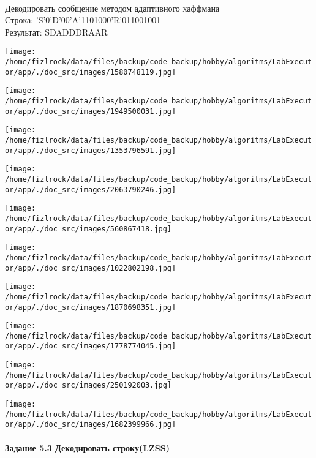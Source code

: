 \documentclass[a4paper, 12pt]{article}
\begin{document}
\\ 

Декодировать сообщение методом адаптивного хаффмана \\
Строка: 
'S'0'D'00'A'1101000'R'011001001\\
Результат: SDADDDRAAR

\texttt{[image: /home/fizlrock/data/files/backup/code\_backup/hobby/algoritms/LabExecutor/app/./doc\_src/images/1580748119.jpg]}

\texttt{[image: /home/fizlrock/data/files/backup/code\_backup/hobby/algoritms/LabExecutor/app/./doc\_src/images/1949500031.jpg]}

\texttt{[image: /home/fizlrock/data/files/backup/code\_backup/hobby/algoritms/LabExecutor/app/./doc\_src/images/1353796591.jpg]}

\texttt{[image: /home/fizlrock/data/files/backup/code\_backup/hobby/algoritms/LabExecutor/app/./doc\_src/images/2063790246.jpg]}

\texttt{[image: /home/fizlrock/data/files/backup/code\_backup/hobby/algoritms/LabExecutor/app/./doc\_src/images/560867418.jpg]}

\texttt{[image: /home/fizlrock/data/files/backup/code\_backup/hobby/algoritms/LabExecutor/app/./doc\_src/images/1022802198.jpg]}

\texttt{[image: /home/fizlrock/data/files/backup/code\_backup/hobby/algoritms/LabExecutor/app/./doc\_src/images/1870698351.jpg]}

\texttt{[image: /home/fizlrock/data/files/backup/code\_backup/hobby/algoritms/LabExecutor/app/./doc\_src/images/1778774045.jpg]}

\texttt{[image: /home/fizlrock/data/files/backup/code\_backup/hobby/algoritms/LabExecutor/app/./doc\_src/images/250192003.jpg]}

\texttt{[image: /home/fizlrock/data/files/backup/code\_backup/hobby/algoritms/LabExecutor/app/./doc\_src/images/1682399966.jpg]}
\pagebreak
\paragraph{Задание 5.3 Декодировать строку(LZSS)\\}
\end{document}
